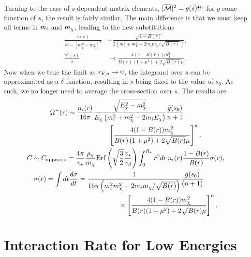 Turning to the case of $s$-dependent matrix elements, $|\overline{\mathcal M}|^2 = \bar{g(s)t^n}$ for $\bar{g}$ some function of $s$, the result is fairly similar. The main difference is that we must keep all terms in $m_i$ and $m_\chi$, leading to the new substitutions
\begin{align}
    \frac{\gamma(s)}{s^2-[m_i^2-m_\chi^2]^2} 
    &\sim \frac{\sqrt{1-B(r)}}{2\left(m_i^2+m_\chi^2+2m_i m_\chi/\sqrt{B(r)}\right)},\\
    \frac{\gamma^2(s)}{s} &\rightarrow \frac{4(1-B(r))m_\chi^2}{B(r)\left(1+\mu^2\right)+2\sqrt{B(r)}\mu}. 
\end{align}
Now when we take the limit as $\varepsilon_{F,n}\rightarrow 0$, the integrand over $s$ can be approximated as a $\delta$-function, resulting in $s$ being fixed to the value of $s_0$. As such, we no longer need to average the cross-section over $s$. The results are
\begin{gather}
    \begin{split}
        \Omega^{-}(r) &\sim \frac{n_i(r)}{16\pi} \frac{\sqrt{E_\chi^2-m_\chi^2}}{E_\chi\left(m_i^2+m_\chi^2+2m_i E_\chi\right)} \frac{\bar{g}(s_0)}{n+1} \\
        & \hspace{6em}\left[\frac{4(1-B(r))m_\chi^2}{B(r)\left(1+\mu^2\right)+2\sqrt{B(r)}\mu}\right]^n.
    \end{split}\\
    C \sim C_{\mathrm{approx}, s} = \frac{4\pi}{v_\star} \frac{\rho_\chi}{m_\chi}{\rm Erf}\left(\sqrt{\frac{3}{2}}\frac{v_\star}{v_d}\right)\int_0^{R_\star}  r^2 dr \, n_i(r)  \frac{1-B(r)}{B(r)} \sigma(r)
\label{app:eq:csimplelargemtext_sdep}, \\
\begin{split}
    \sigma(r) = \int dt \frac{d\sigma}{dt} & =   \frac{1}{16\pi \left(m_i^2 m_\chi^2 + 2m_i m_\chi/\sqrt{B(r)}\right)}\frac{\bar{g}(s_0)}{(n+1)}\\
    &\hspace{6em}\times\left[\frac{4(1 - B(r)) m_\chi^2}{B(r)(1 + \mu^2) + 2\sqrt{B(r)}\mu}\right]^n.
\label{app:eq:xsecave_sdep}
\end{split}
\end{gather}

\section{Interaction Rate for Low Energies}

